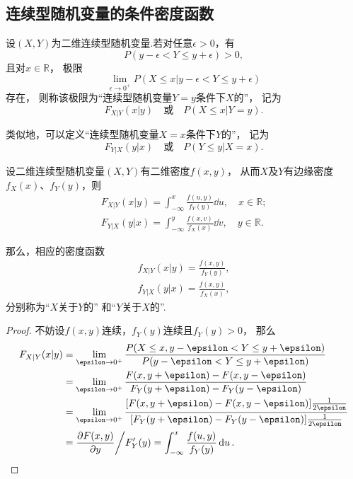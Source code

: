 \subsection{连续型随机变量的条件密度函数}
\begin{definition}
设\((X,Y)\)为二维连续型随机变量.若对任意\(\epsilon > 0\)，有\[
	P(y - \epsilon < Y \leq y + \epsilon) > 0,
\]
且对\(x\in\mathbb{R}\)，
极限\[
	\lim_{\epsilon\to0^+} P(X \leq x \vert y - \epsilon < Y \leq y + \epsilon)
\]存在，
则称该极限为“连续型随机变量\(Y=y\)条件下\(X\)的”，
记为\[
	F_{X \vert Y}(x \vert y)
	\quad\text{或}\quad
	P(X \leq x \vert Y = y).
\]

类似地，可以定义“连续型随机变量\(X=x\)条件下\(Y\)的”，
记为\[
	F_{Y \vert X}(y \vert x)
	\quad\text{或}\quad
	P(Y \leq y \vert X = x).
\]
\end{definition}

\begin{theorem}
设二维连续型随机变量\((X,Y)\)有二维密度\(f(x,y)\)，
从而\(X\)及\(Y\)有边缘密度\(f_X(x)\)、\(f_Y(y)\)，则
\begin{align*}
	F_{X \vert Y}(x \vert y)
	= \int_{-\infty}^x \frac{f(u,y)}{f_Y(y)}\dd{u}, \quad x \in \mathbb{R}; \\
	F_{Y \vert X}(y \vert x)
	= \int_{-\infty}^y \frac{f(x,v)}{f_X(x)}\dd{v}, \quad y \in \mathbb{R}.
\end{align*}

那么，相应的密度函数
\begin{gather}
	f_{X \vert Y}(x \vert y)
	= \frac{f(x,y)}{f_Y(y)},
		\label{equation:多维随机变量及其分布.条件密度、联合密度、边缘密度的关系1} \\
	f_{Y \vert X}(y \vert x)
	= \frac{f(x,y)}{f_X(x)},
		\label{equation:多维随机变量及其分布.条件密度、联合密度、边缘密度的关系2}
\end{gather}
分别称为“\(X\)关于\(Y\)的”%
和“\(Y\)关于\(X\)的”.
\begin{proof}
不妨设\(f(x,y)\)连续，\(f_Y(y)\)连续且\(f_Y(y)>0\)，
\def\l{\lim_{\epsilon\to0^+}}%
那么\begin{align*}
	F_{X \vert Y}(x \vert y)
	&= \l \frac{P(X \leq x, y - \epsilon < Y \leq y + \epsilon)}{P(y - \epsilon < Y \leq y + \epsilon)} \\
	&= \l \frac{F(x,y+\epsilon) - F(x,y-\epsilon)}{F_Y(y+\epsilon) - F_Y(y-\epsilon)} \\
	&= \l \frac{[F(x,y+\epsilon) - F(x,y-\epsilon)] \frac{1}{2 \epsilon}}{[F_Y(y+\epsilon) - F_Y(y-\epsilon)] \frac{1}{2 \epsilon}} \\
	&= \pdv{F(x,y)}{y} \bigg/ F_Y'(y)
	= \int_{-\infty}^x \frac{f(u,y)}{f_Y(y)} \dd{u}.
	\qedhere
\end{align*}
\end{proof}
\end{theorem}

